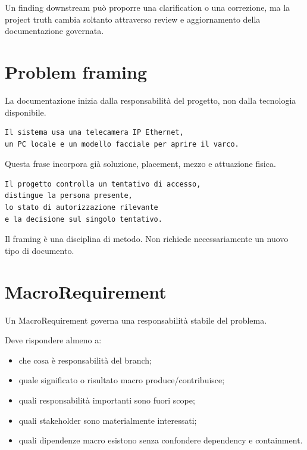 \documentclass[11pt,a4paper]{article}
\begin{document}
Un finding downstream può proporre una clarification o una correzione, ma la project truth cambia soltanto attraverso review e aggiornamento della documentazione governata.

\section{Problem framing}

La documentazione inizia dalla responsabilità del progetto, non dalla tecnologia disponibile.

\begin{badbox}
\begin{lstlisting}
Il sistema usa una telecamera IP Ethernet,
un PC locale e un modello facciale per aprire il varco.
\end{lstlisting}
Questa frase incorpora già soluzione, placement, mezzo e attuazione fisica.
\end{badbox}

\begin{goodbox}
\begin{lstlisting}
Il progetto controlla un tentativo di accesso,
distingue la persona presente,
lo stato di autorizzazione rilevante
e la decisione sul singolo tentativo.
\end{lstlisting}
\end{goodbox}

Il framing è una disciplina di metodo. Non richiede necessariamente un nuovo tipo di documento.

\section{MacroRequirement}

Un MacroRequirement governa una responsabilità stabile del problema.

Deve rispondere almeno a:

\begin{itemize}
\item che cosa è responsabilità del branch;
\item quale significato o risultato macro produce/contribuisce;
\item quali responsabilità importanti sono fuori scope;
\item quali stakeholder sono materialmente interessati;
\item quali dipendenze macro esistono senza confondere dependency e containment.
\end{itemize}
\end{document}

